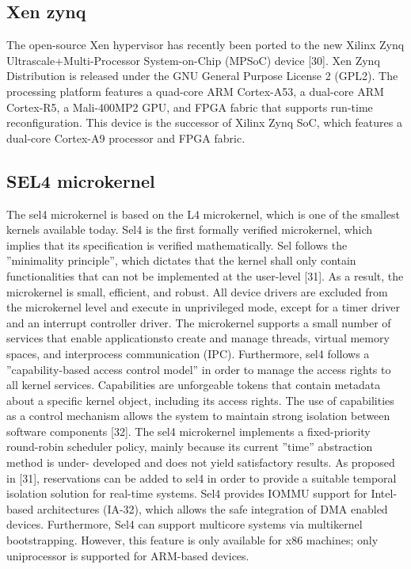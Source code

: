 \subsection{Xen zynq}
The open-source Xen hypervisor has recently been ported to the new
Xilinx Zynq Ultrascale+Multi-Processor System-on-Chip (MPSoC) device
[30]. Xen Zynq Distribution is released under the GNU General Purpose
License 2 (GPL2). The processing platform features a quad-core ARM
Cortex-A53, a dual-core ARM Cortex-R5, a Mali-400MP2 GPU, and FPGA
fabric that supports run-time reconfiguration. This device is the successor of
Xilinx Zynq SoC, which features a dual-core Cortex-A9 processor and FPGA
fabric.

\subsection{SEL4 microkernel}
The sel4 microkernel is based on the L4 microkernel, which is one of the
smallest kernels available today. Sel4 is the first formally verified microkernel,
which implies that its specification is verified mathematically. Sel follows
the ”minimality principle”, which dictates that the kernel shall only contain
functionalities that can not be implemented at the user-level [31]. As a result,
the microkernel is small, efficient, and robust. All device drivers are excluded
from the microkernel level and execute in unprivileged mode, except for a
timer driver and an interrupt controller driver.
The microkernel supports a small number of services that enable applicationsto create and manage threads, virtual memory spaces, and interprocess
communication (IPC). Furthermore, sel4 follows a ”capability-based access
control model” in order to manage the access rights to all kernel services.
Capabilities are unforgeable tokens that contain metadata about a specific
kernel object, including its access rights. The use of capabilities as a control
mechanism allows the system to maintain strong isolation between software
components [32].
The sel4 microkernel implements a fixed-priority round-robin scheduler
policy, mainly because its current ”time” abstraction method is under-
developed and does not yield satisfactory results. As proposed in [31],
reservations can be added to sel4 in order to provide a suitable temporal
isolation solution for real-time systems.
Sel4 provides IOMMU support for Intel-based architectures (IA-32),
which allows the safe integration of DMA enabled devices. Furthermore,
Sel4 can support multicore systems via multikernel bootstrapping. However,
this feature is only available for x86 machines; only uniprocessor is supported
for ARM-based devices.

